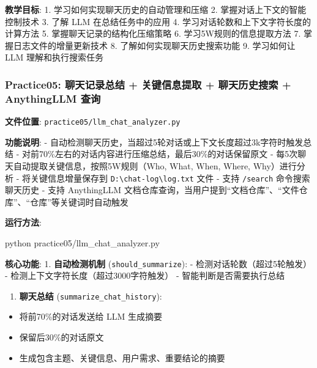 \documentclass[]{article}
\newenvironment{Shaded}{}{}
\newcommand{\ExtensionTok}[1]{#1}
\newcommand{\NormalTok}[1]{#1}
\providecommand{\tightlist}{%
  \setlength{\itemsep}{0pt}\setlength{\parskip}{0pt}}
\begin{document}
\textbf{教学目标}: 1. 学习如何实现聊天历史的自动管理和压缩 2.
掌握对话上下文的智能控制技术 3. 了解 LLM 在总结任务中的应用 4.
学习对话轮数和上下文字符长度的计算方法 5. 掌握聊天记录的结构化压缩策略
6. 学习5W规则的信息提取方法 7. 掌握日志文件的增量更新技术 8.
了解如何实现聊天历史搜索功能 9. 学习如何让 LLM 理解和执行搜索任务

\subsubsection{Practice05: 聊天记录总结 + 关键信息提取 + 聊天历史搜索 +
AnythingLLM
查询}\label{practice05-ux804aux5929ux8bb0ux5f55ux603bux7ed3-ux5173ux952eux4fe1ux606fux63d0ux53d6-ux804aux5929ux5386ux53f2ux641cux7d22-anythingllm-ux67e5ux8be2}

\textbf{文件位置}: \texttt{practice05/llm\_chat\_analyzer.py}

\textbf{功能说明}: -
自动检测聊天历史，当超过5轮对话或上下文长度超过3k字符时触发总结 -
对前70\%左右的对话内容进行压缩总结，最后30\%的对话保留原文 -
每5次聊天自动提取关键信息，按照5W规则（Who, What, When, Where,
Why）进行分析 - 将关键信息增量保存到
\texttt{D:\textbackslash{}chat-log\textbackslash{}log.txt} 文件 - 支持
\texttt{/search} 命令搜索聊天历史 - 支持 AnythingLLM
文档仓库查询，当用户提到``文档仓库''、``文件仓库''、``仓库''等关键词时自动触发

\textbf{运行方法}:

\begin{Shaded}
\begin{Highlighting}[]
\ExtensionTok{python}\NormalTok{ practice05/llm_chat_analyzer.py}
\end{Highlighting}
\end{Shaded}

\textbf{核心功能}: 1. \textbf{自动检测机制}
(\texttt{should\_summarize}): - 检测对话轮数（超过5轮触发） -
检测上下文字符长度（超过3000字符触发） - 智能判断是否需要执行总结

\begin{enumerate}
\def\labelenumi{\arabic{enumi}.}
\setcounter{enumi}{1}
\tightlist
\item
  \textbf{聊天总结} (\texttt{summarize\_chat\_history}):
\end{enumerate}

\begin{itemize}
\tightlist
\item
  将前70\%的对话发送给 LLM 生成摘要
\item
  保留后30\%的对话原文
\item
  生成包含主题、关键信息、用户需求、重要结论的摘要
\end{itemize}
\end{document}
